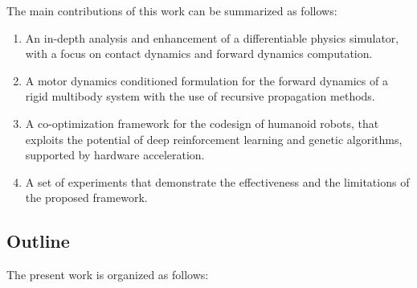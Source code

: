 The main contributions of this work can be summarized as follows:

\begin{enumerate}
    \item An in-depth analysis and enhancement of a differentiable physics simulator, with a focus on contact dynamics and forward dynamics computation.
    \item A motor dynamics conditioned formulation for the forward dynamics of a rigid multibody system with the use of recursive propagation methods.
    \item A co-optimization framework for the codesign of humanoid robots, that exploits the potential of deep reinforcement learning and genetic algorithms, supported by hardware acceleration.
    \item A set of experiments that demonstrate the effectiveness and the limitations of the proposed framework.
\end{enumerate}


\subsection*{Outline}

The present work is organized as follows:

